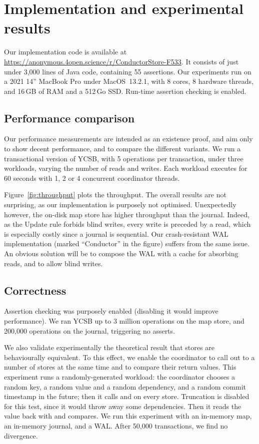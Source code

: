 \section{Implementation and experimental results}
\label{sec:experiments}

Our implementation code is available at
\url{https://anonymous.4open.science/r/ConductorStore-F533}.
It consists of just under 3,000 lines of Java code, containing 55
assertions.
Our experiments run on a 2021 14'' MacBook Pro under MacOS~13.2.1,
with 8 cores, 8 hardware threads, and 16\,GB of RAM and a 512\,Go SSD.
Run-time assertion checking is enabled.

\subsection{Performance comparison}

Our performance measurements are intended as an existence proof, and aim
only to show decent performance, and to compare the different variants.
We run a transactional version of YCSB, with 5 operations per
transaction, under three workloads, varying the number of reads and
writes.
Each workload executes for 60 seconds with 1, 2 or 4 concurrent
coordinator threads.

Figure~\ref{fig:throughput} plots the throughput.
The overall results are not surprising, as our implementation is
purposely not optimised.
Unexpectedly however, the on-disk map store has higher throughput than the
journal.
Indeed, as the Update rule forbids blind writes, every write is preceded
by a read, which is especially costly since a journal is sequential.
Our crash-resistant WAL implementation (marked ``Conductor'' in the
figure) suffers from the same issue.
An obvious solution will be to compose the WAL with a cache for
absorbing reads, and to allow blind writes.

\subsection{Correctness}

Assertion checking was purposely enabled (disabling it
would improve performance).
We ran YCSB up to 3 million operations on the map store,
and 200,000 operations on the journal, triggering no asserts.

We also validate experimentally the theoretical result that stores
are behaviourally equivalent.
To this effect, we enable the coordinator to call out to a number of
stores at the same time and to compare their return values.
This experiment runs a randomly-generated workload: the coordinator
chooses a random key, a random value and a random dependency, and a
random commit timestamp in the future; then it calls \doUpdate{} and
\doCommit{} on every store.
Truncation is disabled for this test, since it would throw away some
dependencies.
Then it reads the value back with \lookup{} and compares.
We run this experiment with an in-memory map, an in-memory journal, and
a WAL.
After 50,000 transactions, we find no divergence.